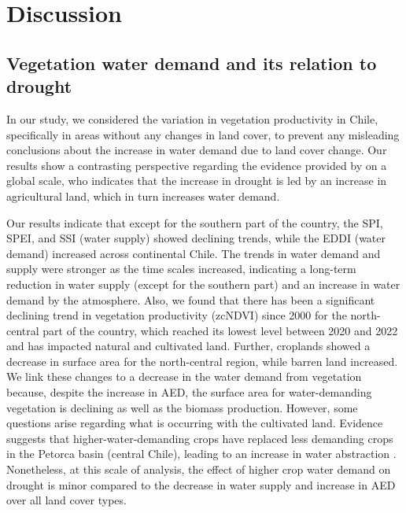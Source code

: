 \documentclass[
  authoryear,
  preprint,
  3p,
  onecolumn]{elsarticle}
\begin{document}
\section{Discussion}\label{discussion}

\subsection{Vegetation water demand and its relation to
drought}\label{vegetation-water-demand-and-its-relation-to-drought}

In our study, we considered the variation in vegetation productivity in
Chile, specifically in areas without any changes in land cover, to
prevent any misleading conclusions about the increase in water demand
due to land cover change. Our results show a contrasting perspective
regarding the evidence provided by \citet{Vicente-Serrano2022} on a
global scale, who indicates that the increase in drought is led by an
increase in agricultural land, which in turn increases water demand.

Our results indicate that except for the southern part of the country,
the SPI, SPEI, and SSI (water supply) showed declining trends, while the
EDDI (water demand) increased across continental Chile. The trends in
water demand and supply were stronger as the time scales increased,
indicating a long-term reduction in water supply (except for the
southern part) and an increase in water demand by the atmosphere. Also,
we found that there has been a significant declining trend in vegetation
productivity (zcNDVI) since 2000 for the north-central part of the
country, which reached its lowest level between 2020 and 2022 and has
impacted natural and cultivated land. Further, croplands showed a
decrease in surface area for the north-central region, while barren land
increased. We link these changes to a decrease in the water demand from
vegetation because, despite the increase in AED, the surface area for
water-demanding vegetation is declining as well as the biomass
production. However, some questions arise regarding what is occurring
with the cultivated land. Evidence suggests that higher-water-demanding
crops have replaced less demanding crops in the Petorca basin (central
Chile), leading to an increase in water abstraction
\citep{Munoz2020, Duran2020}. Nonetheless, at this scale of analysis,
the effect of higher crop water demand on drought is minor compared to
the decrease in water supply and increase in AED over all land cover
types.
\end{document}
